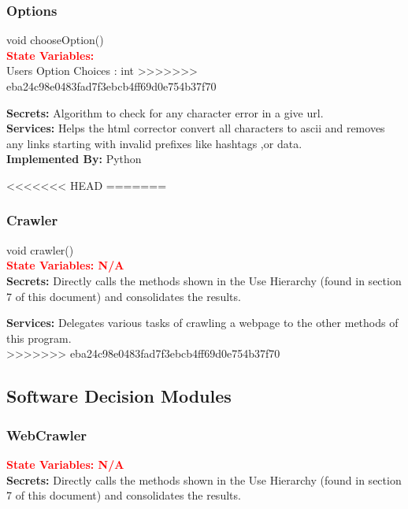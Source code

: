 \documentclass[titlepage]{article}
\begin{document}
{\subsubsection{Options}
void chooseOption()\\
\textcolor{red}{\textbf{State Variables:}}\\
Users Option Choices : int 
>>>>>>> eba24c98e0483fad7f3ebcb4ff69d0e754b37f70

\textbf{Secrets:}
Algorithm to check for any character error in a give url.\\

\textbf{Services:}
 Helps the html corrector convert all characters to ascii and removes any links starting with invalid prefixes like hashtags ,or data.\\

\textbf{Implemented By:}
Python

<<<<<<< HEAD
=======
\subsubsection{Crawler}
void crawler()\\

\textcolor{red}{\textbf{State Variables: N/A}}\\

\textbf{Secrets:}
Directly calls the methods shown in the Use Hierarchy (found in section 7 of this document) and consolidates the results.

\textbf{Services:}
Delegates various tasks of crawling a webpage to the other methods of this program.\\
>>>>>>> eba24c98e0483fad7f3ebcb4ff69d0e754b37f70

\subsection{Software Decision Modules}

\subsubsection{WebCrawler}

\textcolor{red}{\textbf{State Variables: N/A}}\\

\textbf{Secrets:}
Directly calls the methods shown in the Use Hierarchy (found in section 7 of this document) and consolidates the results.

}
\end{document}
